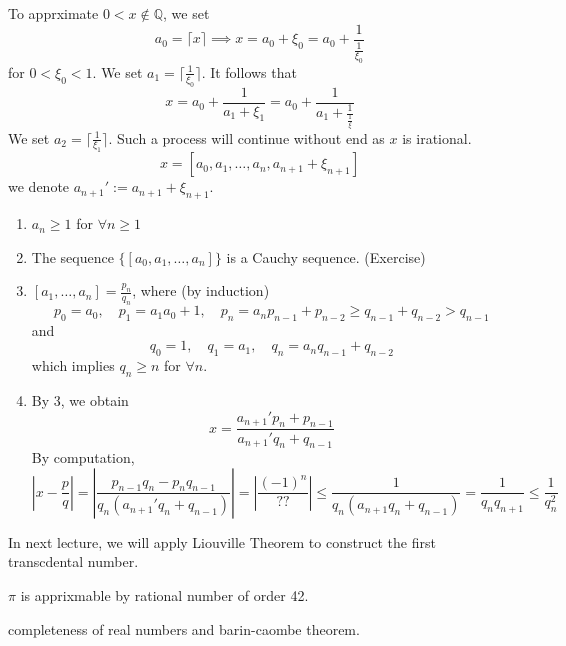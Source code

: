 To apprximate $0<x\notin\mathbb{Q}$, we set
\[
a_0=\lceil{x}\rceil\implies
x = a_0+\xi_0=a_0+\frac{1}{\frac{1}{\xi_0}}
\]
for $0<\xi_0<1$.  We set $a_1=\lceil{\frac{1}{\xi_0}}\rceil$. It follows that
\[
x=a_0+\frac{1}{a_1+\xi_1}=a_0+\frac{1}{a_1+\frac{1}{\frac{1}{\xi}}}
\]
We set $a_2=\lceil{\frac{1}{\xi_1}}\rceil$. Such a process will continue without end as $x$ is irational.
\[
x = [a_0,a_1,\dots,a_n,a_{n+1}+\xi_{n+1}]
\]
we denote $a_{n+1}':=a_{n+1}+\xi_{n+1}$.
\begin{remark}
\begin{enumerate}
\item
$a_n\ge1$ for $\forall n\ge1$
\item
The sequence $\{[a_0,a_1,\dots,a_n]\}$ is a Cauchy sequence. (Exercise)
\item
$[a_1,\dots,a_n]=\frac{p_n}{q_n}$, where (by induction)
\[
p_0=a_0,
\quad
p_1=a_1a_0+1,
\quad
p_n=a_np_{n-1}+p_{n-2}\ge q_{n-1}+q_{n-2}>q_{n-1}
\]
and
\[
q_0 = 1,
\quad
q_1 = a_1,
\quad
q_n = a_nq_{n-1}+q_{n-2}
\]
which implies $q_n\ge n$ for $\forall n$.
\item
By 3, we obtain
\[
x=\frac{a_{n+1}'p_n + p_{n-1}}{a_{n+1}'q_n+q_{n-1}}
\]
By computation,
\[
|x-\frac{p}{q}| = |\frac{p_{n-1}q_n - p_nq_{n-1}}{q_n(a_{n+1}'q_n + q_{n-1})}|=|\frac{(-1)^n}{??}|\le\frac{1}{q_n(a_{n+1}q_n + q_{n-1})}=\frac{1}{q_nq_{n+1}}\le\frac{1}{q_n^2}
\]
\end{enumerate}
\end{remark}
In next lecture, we will apply Liouville Theorem to construct the first transcdental number.

$\pi$ is apprixmable by rational number of order 42.

completeness of real numbers and barin-caombe theorem.










